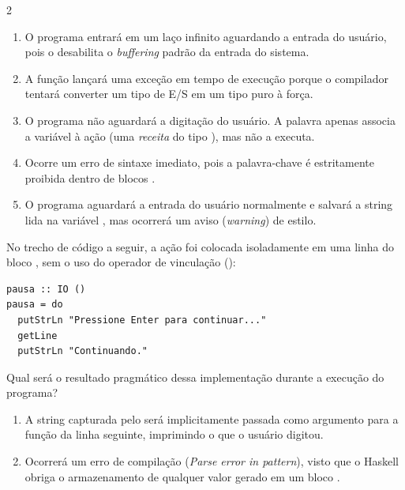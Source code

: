 \documentclass[a4paper,10pt,brazil]{article}
\begin{document}
\begin{multicols}{2}
\begin{enumerate}
  \item O programa entrará em um laço infinito aguardando a entrada do usuário, pois o  desabilita o \emph{buffering} padrão da entrada do sistema.

  \item A função  lançará uma exceção em tempo de execução porque o compilador tentará converter um tipo de E/S em um tipo puro à força.

  \item O programa não aguardará a digitação do usuário. A palavra  apenas associa a variável  à ação (uma \emph{receita} do tipo ), mas não a executa.

  \item Ocorre um erro de sintaxe imediato, pois a palavra-chave  é estritamente proibida dentro de blocos .

  \item O programa aguardará a entrada do usuário normalmente e salvará a string lida na variável , mas ocorrerá um aviso (\emph{warning}) de estilo.


\end{enumerate}

No trecho de código a seguir, a ação  foi colocada isoladamente em uma linha do bloco , sem o uso do operador de vinculação (\haskellinline{<-}):

\begin{verbatim}
pausa :: IO ()
pausa = do
  putStrLn "Pressione Enter para continuar..."
  getLine
  putStrLn "Continuando."
\end{verbatim}

Qual será o resultado pragmático dessa implementação durante a execução do programa?

\begin{enumerate}
  \item A string capturada pelo  será implicitamente passada como argumento para a função  da linha seguinte, imprimindo o que o usuário digitou.

  \item Ocorrerá um erro de compilação (\emph{Parse error in pattern}), visto que o Haskell obriga o armazenamento de qualquer valor gerado em um bloco .


\end{enumerate}
\end{multicols}
\end{document}
